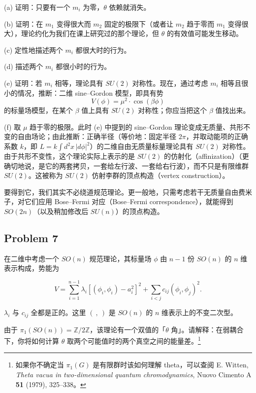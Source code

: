 (a) 证明：只要有一个 $m_i$ 为零，$\theta$ 依赖就消失。

(b) 证明：在 $m_1$ 变得很大而 $m_2$ 固定的极限下（或者让 $m_2$ 趋于零而 $m_1$ 变得很大），理论约化为我们在课上研究过的那个理论，但 $\theta$ 的有效值可能发生移动。

(c) 定性地描述两个 $m_i$ 都很大时的行为。

(d) 描述两个 $m_i$ 都很小时的行为。

(e) 证明：若 $m_i$ 相等，理论具有 $SU(2)$ 对称性。现在，通过考虑 $m_i$ 相等且很小的情况，推断：二维 sine–Gordon 模型，即具有势
\[
  V(\phi)=\mu^2\cdot\cos(\beta\phi)
\]
的标量场模型，在某个 $\beta$ 值上具有 $SU(2)$ 对称性；你应当把这个 $\beta$ 值找出来。


(f) 取 $\mu$ 趋于零的极限。此时 (e) 中提到的 sine–Gordon 理论变成无质量、共形不变的自由场论；由此推断：正确半径（等价地：固定半径 $2\pi$，并取动能项的正确系数 $k$，即 $L=k\int d^2x\,|d\phi|^2$）的二维自由无质量标量理论具有 $SU(2)$ 对称性。由于共形不变性，这个理论实际上表示的是 $SU(2)$ 的仿射化（affinization）（更确切地说，是它的两套拷贝，一套给左行波、一套给右行波），而不只是有限维群 $SU(2)$。这被称为 $SU(2)$ 仿射李群的顶点构造（vertex construction）。

要得到它，我们其实不必绕道规范理论。更一般地，只需考虑若干无质量自由费米子，对它们应用 Bose–Fermi 对应（Bose–Fermi correspondence），就能得到 $SO(2n)$（以及稍加修改后 $SU(n)$）的顶点构造。

\subsection*{Problem 7}

在二维中考虑一个 $SO(n)$ 规范理论，其标量场 $\phi$ 由 $n-1$ 份 $SO(n)$ 的 $n$ 维表示构成，势能为

\begin{equation}
  \tag{7}
  \label{eq:ex-7}
  V=\sum_{i=1}^{n-1}\lambda_i\left[(\phi_i,\phi_i)-a_i^2\right]^2+\sum_{i<j}c_{ij}(\phi_i,\phi_j)^2 .
\end{equation}

$\lambda_i$ 与 $c_{ij}$ 全都是正的。这里 $(\ ,\ )$ 是 $SO(n)$ 的 $n$ 维表示上的不变二次型。

由于 $\pi_1(SO(n))=\mathbb{Z}/2\mathbb{Z}$，该理论有一个双值的「$\theta$ 角」。请解释：在弱耦合下，你将如何计算 $\theta$ 取两个可能值时的两个真空之间的能量差。\footnote{如果你不确定当 $\pi_1(G)$ 是有限群时该如何理解 theta，可以查阅 E. Witten, \textit{Theta vacua in two-dimensional quantum chromodynamics}, Nuovo Cimento A \textbf{51} (1979), 325--338。}

